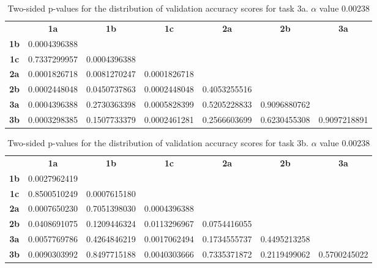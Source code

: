 \newpage

\begin{table}[h!]
    \centering
    \begin{tabular}{ccccccc}
                & \textbf{1a}        & \textbf{1b}        & \textbf{1c}        & \textbf{2a}  & \textbf{2b}  & \textbf{3a}  \\
    \textbf{1b} & 0.0004396388 &                    &                    &              &              &              \\
    \textbf{1c} & 0.7337299957 & 0.0004396388       &                    &              &              &              \\
    \textbf{2a} & 0.0001826718 & 0.0081270247       & 0.0001826718       &              &              &              \\
    \textbf{2b} & 0.0002448048 & 0.0450737863       & 0.0002448048       & 0.4053255516 &              &              \\
    \textbf{3a} & 0.0004396388 & 0.2730363398       & 0.0005828399       & 0.5205228833 & 0.9096880762 &              \\
    \textbf{3b} & 0.0003298385 & 0.1507733379       & 0.0002461281       & 0.2566603699 & 0.6230455308 & 0.9097218891
    \end{tabular}
    \caption{Two-sided p-values for the distribution of validation accuracy scores for task 3a. \(\alpha\) value 0.00238}
    \label{tab:exp2.validation3a}
\end{table}

\begin{table}[h!]
    \centering
    \begin{tabular}{ccccccc}
                & \textbf{1a}        & \textbf{1b}        & \textbf{1c}        & \textbf{2a}  & \textbf{2b}  & \textbf{3a}  \\
    \textbf{1b} & 0.0027962419       &                    &                    &              &              &              \\
    \textbf{1c} & 0.8500510249       & 0.0007615180       &                    &              &              &              \\
    \textbf{2a} & 0.0007650230       & 0.7051398030       & 0.0004396388       &              &              &              \\
    \textbf{2b} & 0.0408691075       & 0.1209446324       & 0.0113296967       & 0.0754416055 &              &              \\
    \textbf{3a} & 0.0057769786       & 0.4264846219       & 0.0017062494       & 0.1734555737 & 0.4495213258 &              \\
    \textbf{3b} & 0.0090303992       & 0.8497715188       & 0.0040303666       & 0.7335371872 & 0.2119499062 & 0.5700245022
    \end{tabular}
    \caption{Two-sided p-values for the distribution of validation accuracy scores for task 3b. \(\alpha\) value 0.00238}
    \label{tab:exp2.validation3b}
\end{table}

